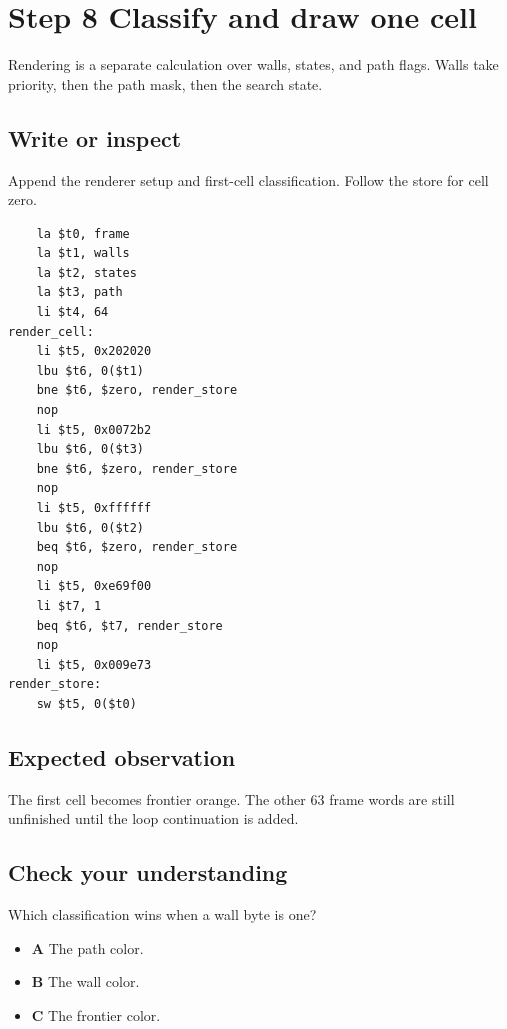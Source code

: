 \section{Step 8 Classify and draw one cell}\label{maze-s08}

Rendering is a separate calculation over walls, states, and path flags. Walls take priority, then the path mask, then the search state.

\subsection{Write or inspect}

Append the renderer setup and first-cell classification. Follow the store for cell zero.

\begin{verbatim}
    la $t0, frame
    la $t1, walls
    la $t2, states
    la $t3, path
    li $t4, 64
render_cell:
    li $t5, 0x202020
    lbu $t6, 0($t1)
    bne $t6, $zero, render_store
    nop
    li $t5, 0x0072b2
    lbu $t6, 0($t3)
    bne $t6, $zero, render_store
    nop
    li $t5, 0xffffff
    lbu $t6, 0($t2)
    beq $t6, $zero, render_store
    nop
    li $t5, 0xe69f00
    li $t7, 1
    beq $t6, $t7, render_store
    nop
    li $t5, 0x009e73
render_store:
    sw $t5, 0($t0)
\end{verbatim}

\subsection{Expected observation}

The first cell becomes frontier orange. The other 63 frame words are still unfinished until the loop continuation is added.

\subsection{Check your understanding}

Which classification wins when a wall byte is one?

\begin{itemize}
  \item \textbf{A} The path color.
  \item \textbf{B} The wall color.
  \item \textbf{C} The frontier color.
\end{itemize}
